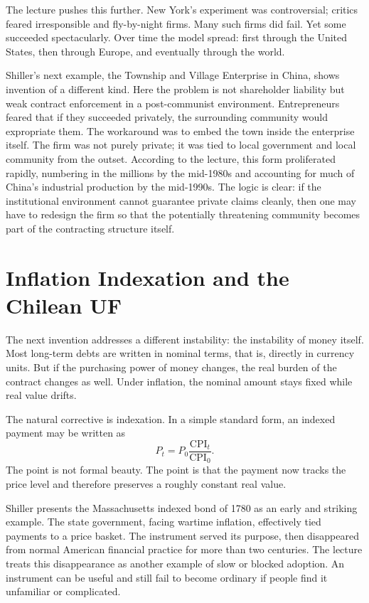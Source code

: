The lecture pushes this further. New York's experiment was controversial; critics feared irresponsible and fly-by-night firms. Many such firms did fail. Yet some succeeded spectacularly. Over time the model spread: first through the United States, then through Europe, and eventually through the world.

Shiller's next example, the Township and Village Enterprise in China, shows invention of a different kind. Here the problem is not shareholder liability but weak contract enforcement in a post-communist environment. Entrepreneurs feared that if they succeeded privately, the surrounding community would expropriate them. The workaround was to embed the town inside the enterprise itself. The firm was not purely private; it was tied to local government and local community from the outset. According to the lecture, this form proliferated rapidly, numbering in the millions by the mid-1980s and accounting for much of China's industrial production by the mid-1990s. The logic is clear: if the institutional environment cannot guarantee private claims cleanly, then one may have to redesign the firm so that the potentially threatening community becomes part of the contracting structure itself.

\section{Inflation Indexation and the Chilean UF}

The next invention addresses a different instability: the instability of money itself. Most long-term debts are written in nominal terms, that is, directly in currency units. But if the purchasing power of money changes, the real burden of the contract changes as well. Under inflation, the nominal amount stays fixed while real value drifts.

The natural corrective is indexation. In a simple standard form, an indexed payment may be written as
\begin{equation}
P_t = P_0 \frac{\mathrm{CPI}_t}{\mathrm{CPI}_0}.
\end{equation}
The point is not formal beauty. The point is that the payment now tracks the price level and therefore preserves a roughly constant real value.

Shiller presents the Massachusetts indexed bond of 1780 as an early and striking example. The state government, facing wartime inflation, effectively tied payments to a price basket. The instrument served its purpose, then disappeared from normal American financial practice for more than two centuries. The lecture treats this disappearance as another example of slow or blocked adoption. An instrument can be useful and still fail to become ordinary if people find it unfamiliar or complicated.


